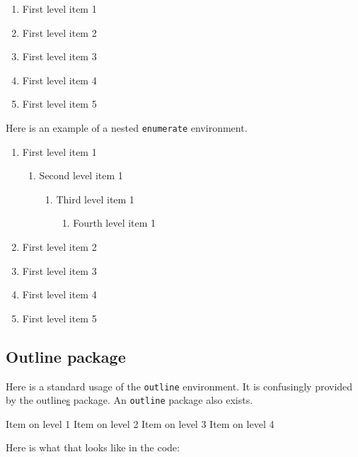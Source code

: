     \begin{enumerate}
        \item First level item 1
        \item First level item 2
        \item First level item 3
        \item First level item 4
        \item First level item 5
    \end{enumerate}

    Here is an example of a nested \verb|enumerate| environment.

    \begin{enumerate}
        \item First level item 1
        \begin{enumerate}
            \item Second level item 1
            \begin{enumerate}
                \item Third level item 1
                \begin{enumerate}
                    \item Fourth level item 1
                \end{enumerate}
            \end{enumerate}
        \end{enumerate}
        \item First level item 2
        \item First level item 3
        \item First level item 4
        \item First level item 5
    \end{enumerate}

\subsection{Outline package}

Here is a standard usage of the \verb|outline| environment. It is confusingly provided by the outline\underline{s} package. An \texttt{outline} package also exists.

    \begin{outline}
        \1 Item on level 1
        \2 Item on level 2
        \3 Item on level 3
        \4 Item on level 4
    \end{outline}

    Here is what that looks like in the code:

